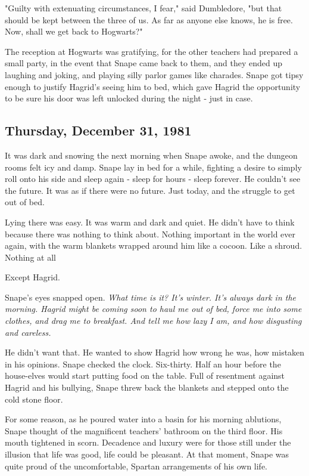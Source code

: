"Guilty with extenuating circumstances, I fear," said Dumbledore, "but that should be kept between the three of us. As far as anyone else knows, he is free. Now, shall we get back to Hogwarts?"

The reception at Hogwarts was gratifying, for the other teachers had prepared a small party, in the event that Snape came back to them, and they ended up laughing and joking, and playing silly parlor games like charades. Snape got tipsy enough to justify Hagrid's seeing him to bed, which gave Hagrid the opportunity to be sure his door was left unlocked during the night - just in case.

\subsection{Thursday, December 31, 1981}

It was dark and snowing the next morning when Snape awoke, and the dungeon rooms felt icy and damp. Snape lay in bed for a while, fighting a desire to simply roll onto his side and sleep again - sleep for hours - sleep forever. He couldn't see the future. It was as if there were no future. Just today, and the struggle to get out of bed.

Lying there was easy. It was warm and dark and quiet. He didn't have to think because there was nothing to think about. Nothing important in the world ever again, with the warm blankets wrapped around him like a cocoon. Like a shroud. Nothing at all{\el}

Except Hagrid.

Snape's eyes snapped open. \emph{What time is it? It's winter. It's always dark in the morning. Hagrid might be coming soon to haul me out of bed, force me into some clothes, and drag me to breakfast. And tell me how lazy I am, and how disgusting and careless.}

He didn't want that. He wanted to show Hagrid how wrong he was, how mistaken in his opinions. Snape checked the clock. Six-thirty. Half an hour before the house-elves would start putting food on the table. Full of resentment against Hagrid and his bullying, Snape threw back the blankets and stepped onto the cold stone floor.

For some reason, as he poured water into a basin for his morning ablutions, Snape thought of the magnificent teachers' bathroom on the third floor. His mouth tightened in scorn. Decadence and luxury were for those still under the illusion that life was good, life could be pleasant. At that moment, Snape was quite proud of the uncomfortable, Spartan arrangements of his own life.

